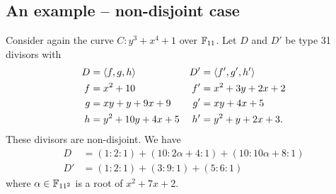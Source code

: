 
\subsection{An example -- non-disjoint case}

Consider again the curve $C : y^3 + x^4 + 1$ over $\mathbb{F}_{11}$.
Let $D$ and $D'$ be type 31 divisors with
\begin{align*}
  D  &= \left\langle f, g, h \right\rangle      & D' &= \left\langle f', g', h' \right\rangle \\
  f  &= x^2 + 10           & f' &= x^2 + 3y + 2x + 2 \\
  g  &= xy + y + 9x + 9    & g' &= xy + 4x + 5 \\
  h  &= y^2 + 10y + 4x + 5 & h' &= y^2 + y + 2x + 3 .\\
\end{align*}
These divisors are non-disjoint. We have
\begin{align*}
  D &= (1 : 2 : 1) + (10 : 2\alpha + 4 : 1) + (10 : 10\alpha + 8 : 1) \\
  D' &= (1 : 2 : 1) + (3 : 9 : 1) + (5 : 6 : 1)
\end{align*}
where $\alpha \in \mathbb{F}_{11^2}$ is a root of $x^2 + 7x + 2$.

\begin{center}
\end{center}

